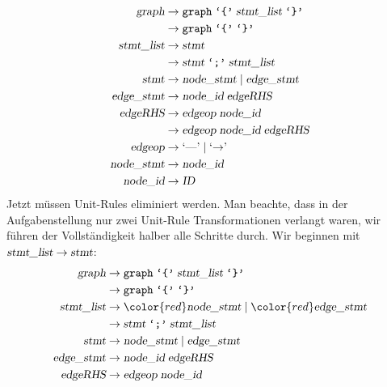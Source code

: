 \begin{loesung}
\begin{teilaufgaben}
\begin{align*}
\textsl{graph}     &\rightarrow \texttt{graph}\; \texttt{`\{'}\; \textsl{stmt\_list}\; \texttt{`\}'} \\
                   &\rightarrow \texttt{graph}\; \texttt{`\{'}\; \texttt{`\}'} \\
\textsl{stmt\_list}&\rightarrow \textsl{stmt}\\
                   &\rightarrow \textsl{stmt}\; \texttt{`;'}\; \textsl{stmt\_list}\\
\textsl{stmt}      &\rightarrow \textsl{node\_stmt}\; |\;
                                \textsl{edge\_stmt} \\
\textsl{edge\_stmt}&\rightarrow \textsl{node\_id}\; \textsl{edgeRHS} \\
\textsl{edgeRHS}   &\rightarrow \textsl{edgeop}\; \textsl{node\_id}\\
                   &\rightarrow \textsl{edgeop}\; \textsl{node\_id}\; \textsl{edgeRHS}\\
\textsl{edgeop}    &\rightarrow \textrm{`\text{---}'}\; |\; \textrm{`$\rightarrow$'}\; \\
\textsl{node\_stmt}&\rightarrow \textsl{node\_id} \\
\textsl{node\_id}  &\rightarrow \textsl{ID}
\end{align*}
Jetzt müssen Unit-Rules eliminiert werden. Man beachte, dass in der Aufgabenstellung
nur zwei Unit-Rule Transformationen verlangt waren, wir führen der Vollständigkeit
halber alle Schritte durch.
Wir beginnen mit $\textsl{stmt\_list}\to\textsl{stmt}$:
\begin{align*}
\textsl{graph}     &\rightarrow \texttt{graph}\; \texttt{`\{'}\; \textsl{stmt\_list}\; \texttt{`\}'} \\
                   &\rightarrow \texttt{graph}\; \texttt{`\{'}\; \texttt{`\}'} \\
\textsl{stmt\_list}&\rightarrow {\color{red}\textsl{node\_stmt}}\; |\;
                                {\color{red}\textsl{edge\_stmt}} \\
                   &\rightarrow \textsl{stmt}\; \texttt{`;'}\; \textsl{stmt\_list}\\
\textsl{stmt}      &\rightarrow \textsl{node\_stmt}\; |\;
                                \textsl{edge\_stmt} \\
\textsl{edge\_stmt}&\rightarrow \textsl{node\_id}\; \textsl{edgeRHS} \\
\textsl{edgeRHS}   &\rightarrow \textsl{edgeop}\; \textsl{node\_id}\\

\end{align*}
\end{teilaufgaben}
\end{loesung}
